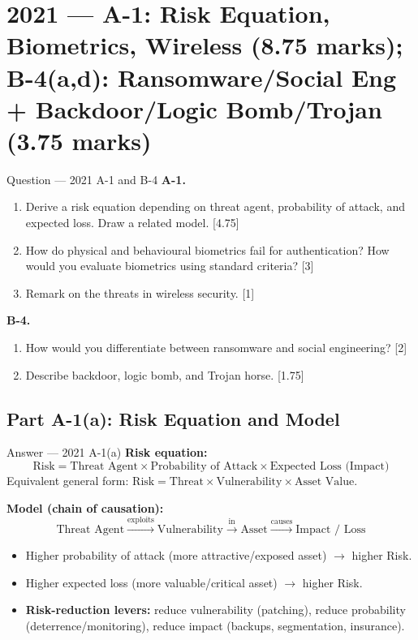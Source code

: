 \documentclass[12pt,a4paper]{article}
\begin{document}
\newpage
\section{2021 --- A-1: Risk Equation, Biometrics, Wireless (8.75 marks); B-4(a,d): Ransomware/Social Eng + Backdoor/Logic Bomb/Trojan (3.75 marks)}

\begin{qbox}{Question --- 2021 A-1 and B-4}
\textbf{A-1.}
\begin{enumerate}[label=(\alph*)]
  \item Derive a risk equation depending on threat agent, probability of attack, and expected loss. Draw a related model. \hfill [4.75]
  \item How do physical and behavioural biometrics fail for authentication? How would you evaluate biometrics using standard criteria? \hfill [3]
  \item Remark on the threats in wireless security. \hfill [1]
\end{enumerate}
\textbf{B-4.}
\begin{enumerate}[label=(\alph*)]
  \item How would you differentiate between ransomware and social engineering? \hfill [2]
  \item[(d)] Describe backdoor, logic bomb, and Trojan horse. \hfill [1.75]
\end{enumerate}
\end{qbox}

\subsection{Part A-1(a): Risk Equation and Model}
\begin{solbox}{Answer --- 2021 A-1(a)}
\textbf{Risk equation:}
\[
\text{Risk} = \text{Threat Agent} \times \text{Probability of Attack} \times \text{Expected Loss (Impact)}
\]
Equivalent general form: $\text{Risk}=\text{Threat}\times\text{Vulnerability}\times\text{Asset Value}$.

\textbf{Model (chain of causation):}
\[
\boxed{\text{Threat Agent}} \xrightarrow{\text{exploits}} \boxed{\text{Vulnerability}} \xrightarrow{\text{in}} \boxed{\text{Asset}} \xrightarrow{\text{causes}} \boxed{\text{Impact / Loss}}
\]

\begin{itemize}[noitemsep]
  \item Higher probability of attack (more attractive/exposed asset) $\to$ higher Risk.
  \item Higher expected loss (more valuable/critical asset) $\to$ higher Risk.
  \item \textbf{Risk-reduction levers:} reduce vulnerability (patching), reduce probability (deterrence/monitoring), reduce impact (backups, segmentation, insurance).
\end{itemize}
\end{solbox}
\end{document}
